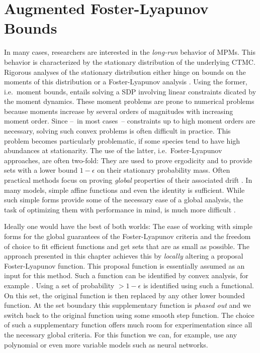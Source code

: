\chapter{Augmented Foster-Lyapunov Bounds}
In many cases, researchers are interested in the \emph{long-run} behavior of \acp{MPM}.
This behavior is characterized by the stationary distribution of the underlying \ac{CTMC}.
Rigorous analyses of the stationary distribution either hinge on bounds on the moments of this distribution or a Foster-Lyapunov analysis \cite{kuntz2021stationary}.
Using the former, i.e.\ moment bounds, entails solving a \acl{SDP} involving linear constraints dicated by the moment dynamics.
These moment problems are prone to numerical problems because moments increase by several orders of magnitudes with increasing moment order.
Since --~in most cases~-- constraints up to high moment orders are necessary, solving such convex problems is often difficult in practice.
This problem becomes particularly problematic, if some species tend to have high abundances at stationarity.
The use of the latter, i.e.\ Foster-Lyapunov approaches, are often two-fold: They are used to prove ergodicity and to provide sets with a lower bound $1-\epsilon$ on their stationary probability mass.
Often practical methods focus on proving \emph{global} properties of their associated drift \cite{gupta2014scalable,spieler2014numerical}.
In many models, simple affine functions \cite{gupta2017finite} and even the identity \cite{spieler2014numerical} is sufficient.
While such simple forms provide some of the necessary ease of a global analysis, the task of optimizing them with performance in mind, is much more difficult \cite{milias2014optimization}.

Ideally one would have the best of both worlds: The ease of working with simple forms for the global guarantees of the Foster-Lyapunov criteria and the freedom of choice to fit efficient functions and get sets that are as small as possible.
The approach presented in this chapter achieves this by \emph{locally} altering a proposal Foster-Lyapunov function.
This proposal function is essentially assumed as an input for this method.
Such a function can be identified by convex analysis, for example \cite{gupta2014scalable}.
Using a set of probability $>1-\epsilon$ is identified using such a functional.
On this set, the original function is then replaced by any other lower bounded function.
At the set boundary this supplementary function is \emph{phased out} and we switch back to the original function using some smooth step function.
The choice of such a supplementary function offers much room for experimentation since all the necessary global criteria.
For this function we can, for example, use any polynomial or even more variable models such as neural networks.

